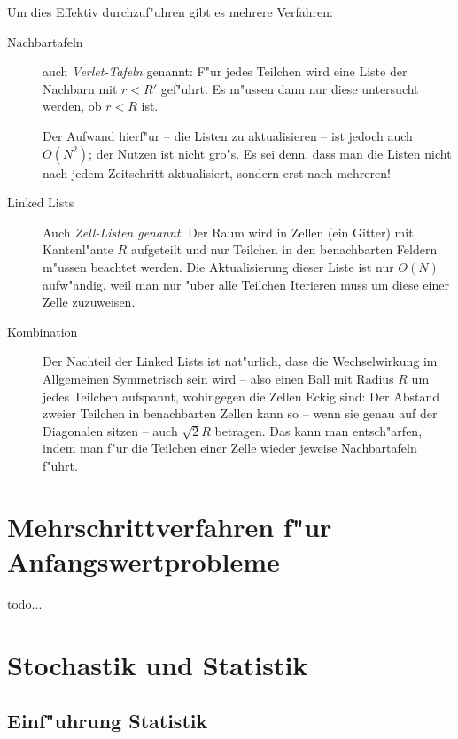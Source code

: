 \documentclass[a4paper]{book}
\begin{document}
Um dies Effektiv
durchzuf"uhren gibt es mehrere Verfahren:
\begin{description}
\item[Nachbartafeln] auch \emph{Verlet-Tafeln} genannt: F"ur jedes
  Teilchen wird eine Liste der Nachbarn mit $r < R'$ gef"uhrt. Es
  m"ussen dann nur diese untersucht werden, ob $r < R$ ist.

  Der Aufwand hierf"ur -- die Listen zu aktualisieren -- ist jedoch
  auch $O(N^2)$; der Nutzen ist nicht gro"s. Es sei denn, dass man die
  Listen nicht nach jedem Zeitschritt aktualisiert, sondern erst nach mehreren!
\item[Linked Lists] Auch \emph{Zell-Listen genannt}: Der Raum wird in
  Zellen (ein Gitter) mit Kantenl"ante $R$ aufgeteilt und nur Teilchen in den benachbarten
  Feldern m"ussen beachtet werden. Die Aktualisierung dieser Liste ist
  nur $O(N)$ aufw"andig, weil man nur "uber alle Teilchen Iterieren
  muss um diese einer Zelle zuzuweisen.
\item[Kombination] Der Nachteil der Linked Lists ist nat"urlich, dass
  die Wechselwirkung im Allgemeinen Symmetrisch sein wird -- also
  einen Ball mit Radius $R$ um jedes Teilchen aufspannt, wohingegen
  die Zellen Eckig sind: Der Abstand zweier Teilchen in benachbarten
  Zellen kann so -- wenn sie genau auf der Diagonalen sitzen -- auch
  $\sqrt 2 R$ betragen. Das kann man entsch"arfen, indem man f"ur die
  Teilchen einer Zelle wieder jeweise Nachbartafeln f"uhrt.
\end{description}



\chapter{Mehrschrittverfahren f"ur Anfangswertprobleme}
\label{cha:mehrschr_fur_anfangsw}

todo...







\chapter{Stochastik und Statistik}
\label{cha:stochastik_und_statistik}


\section{Einf"uhrung Statistik}
\label{sec:einfuhrung_statistik}
\end{document}
